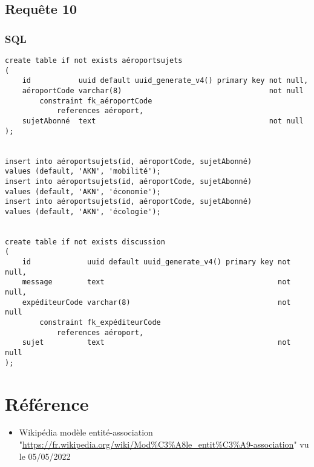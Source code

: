 \documentclass[french, utf8]{article}
\begin{document}
\subsection{Requête 10}
\subsubsection{SQL}

\begin{verbatim}
create table if not exists aéroportsujets
(
    id           uuid default uuid_generate_v4() primary key not null,
    aéroportCode varchar(8)                                  not null
        constraint fk_aéroportCode
            references aéroport,
    sujetAbonné  text                                        not null
);


insert into aéroportsujets(id, aéroportCode, sujetAbonné)
values (default, 'AKN', 'mobilité');
insert into aéroportsujets(id, aéroportCode, sujetAbonné)
values (default, 'AKN', 'économie');
insert into aéroportsujets(id, aéroportCode, sujetAbonné)
values (default, 'AKN', 'écologie');


create table if not exists discussion
(
    id             uuid default uuid_generate_v4() primary key not null,
    message        text                                        not null,
    expéditeurCode varchar(8)                                  not null
        constraint fk_expéditeurCode
            references aéroport,
    sujet          text                                        not null
);

\end{verbatim}

\section{Référence} \label{sec:ref}

\begin{itemize}
    \item Wikipédia modèle entité-association "\url{https://fr.wikipedia.org/wiki/Mod%C3%A8le_entit%C3%A9-association}" vu le 05/05/2022
\end{itemize}
\end{document}
